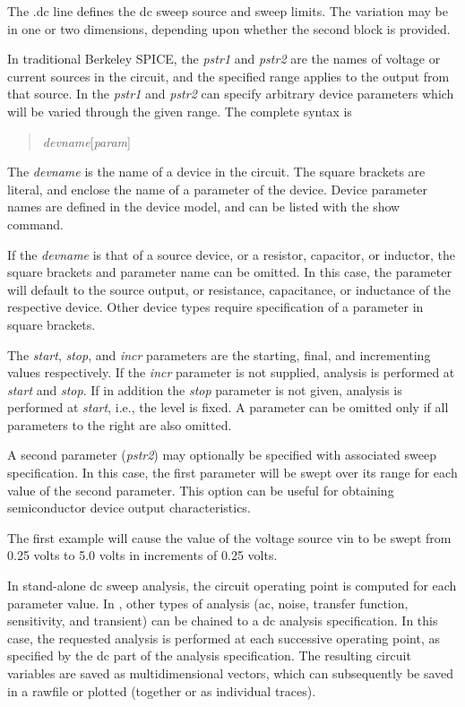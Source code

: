 The {\vt .dc} line defines the dc sweep source and sweep limits.  The
variation may be in one or two dimensions, depending upon whether the
second block is provided.

In traditional Berkeley SPICE, the {\it pstr1} and {\it pstr2} are the
names of voltage or current sources in the circuit, and the specified
range applies to the output from that source.  In {\WRspice} the {\it
pstr1} and {\it pstr2} can specify arbitrary device parameters which
will be varied through the given range.  The complete syntax is

\begin{quote}
{\it devname\/}{\vt [}{\it param\/}{\vt ]}
\end{quote}

The {\it devname} is the name of a device in the circuit.  The square
brackets are literal, and enclose the name of a parameter of the
device.  Device parameter names are defined in the device model, and
can be listed with the {\cb show} command.

If the {\it devname} is that of a source device, or a resistor,
capacitor, or inductor, the square brackets and parameter name can be
omitted.  In this case, the parameter will default to the source
output, or resistance, capacitance, or inductance of the respective
device.  Other device types require specification of a parameter in
square brackets.

The {\it start\/}, {\it stop\/}, and {\it incr} parameters are the
starting, final, and incrementing values respectively.  If the {\it
incr} parameter is not supplied, analysis is performed at {\it start}
and {\it stop\/}.  If in addition the {\it stop} parameter is not
given, analysis is performed at {\it start\/}, i.e., the level is
fixed.  A parameter can be omitted only if all parameters to the right
are also omitted.

A second parameter ({\it pstr2\/}) may optionally be specified with
associated sweep specification.  In this case, the first parameter
will be swept over its range for each value of the second parameter. 
This option can be useful for obtaining semiconductor device output
characteristics.

The first example will cause the value of the voltage source {\vt vin}
to be swept from 0.25 volts to 5.0 volts in increments of 0.25 volts.

In stand-alone dc sweep analysis, the circuit operating point is
computed for each parameter value.  In {\WRspice}, other types of
analysis (ac, noise, transfer function, sensitivity, and transient)
can be chained to a dc analysis specification.  In this case, the
requested analysis is performed at each successive operating point, as
specified by the dc part of the analysis specification.  The resulting
circuit variables are saved as multidimensional vectors, which can
subsequently be saved in a rawfile or plotted (together or as
individual traces).

